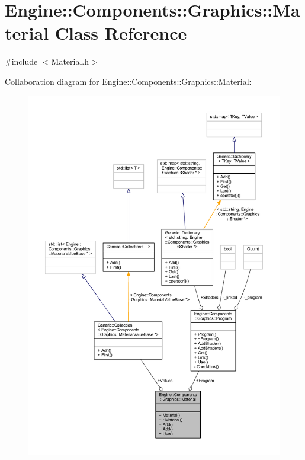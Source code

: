 \hypertarget{classEngine_1_1Components_1_1Graphics_1_1Material}{}\section{Engine\+:\+:Components\+:\+:Graphics\+:\+:Material Class Reference}
\label{classEngine_1_1Components_1_1Graphics_1_1Material}


{\ttfamily \#include $<$Material.\+h$>$}



Collaboration diagram for Engine\+:\+:Components\+:\+:Graphics\+:\+:Material\+:
\nopagebreak
\begin{figure}[H]
\begin{center}
\leavevmode
\includegraphics[width=350pt]{classEngine_1_1Components_1_1Graphics_1_1Material__coll__graph}
\end{center}
\end{figure}
